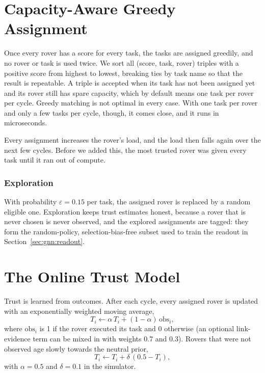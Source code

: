\section{Capacity-Aware Greedy Assignment}

Once every rover has a score for every task, the tasks are assigned
greedily, and no rover or task is used twice. We sort all (score, task, rover)
triples with a positive score from highest to lowest, breaking ties by task
name so that the result is repeatable. A triple is accepted when its task has
not been assigned yet and its rover still has spare capacity, which by default
means one task per rover per cycle. Greedy matching is not optimal in every
case. With one task per rover and only a few tasks per cycle, though, it comes
close, and it runs in microseconds.

Every assignment increases the rover's load, and the load then falls again
over the next few cycles. Before we added this, the most trusted rover was
given every task until it ran out of compute.

\subsubsection{Exploration} With probability $\varepsilon=0.15$ per task,
the assigned rover is replaced by a random eligible one. Exploration keeps
trust estimates honest, because a rover that is never chosen is never
observed, and the explored assignments are tagged: they form the
random-policy, selection-bias-free subset used to train the readout in
Section~\ref{sec:gnn:readout}.

\section{The Online Trust Model}

Trust is learned from outcomes. After each cycle, every assigned rover is
updated with an exponentially weighted moving average,
\begin{equation}
T_i\leftarrow\alpha\,T_i+(1-\alpha)\,\mathrm{obs}_i,
\label{eq:gnn:ewma}
\end{equation}
where $\mathrm{obs}_i$ is 1 if the rover executed its task and 0 otherwise
(an optional link-evidence term can be mixed in with weights 0.7 and 0.3).
Rovers that were not observed age slowly towards the neutral prior,
\begin{equation}
T_i\leftarrow T_i+\delta\,(0.5-T_i),
\label{eq:gnn:aging}
\end{equation}
with $\alpha=0.5$ and $\delta=0.1$ in the simulator.

